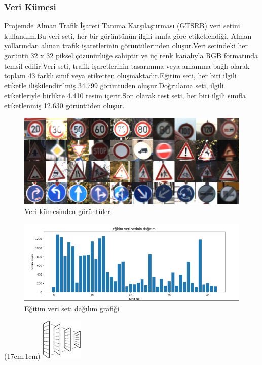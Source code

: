 \documentclass{article}
\begin{document}
\subsubsection{Veri Kümesi}
Projemde Alman Trafik İşareti Tanıma Karşılaştırması (GTSRB)\cite{ElectronicResearchDataArchive} veri setini kullandım.Bu veri seti, her bir görüntünün ilgili sınıfa göre etiketlendiği, Alman yollarından alınan trafik işaretlerinin görüntülerinden oluşur.Veri setindeki her görüntü 32 x 32 piksel çözünürlüğe sahiptir ve üç renk kanalıyla RGB formatında temsil edilir.Veri seti, trafik işaretlerinin tasarımına veya anlamına bağlı olarak toplam 43 farklı sınıf veya etiketten oluşmaktadır.Eğitim seti, her biri ilgili etiketle ilişkilendirilmiş 34.799 görüntüden oluşur.Doğrulama seti, ilgili etiketleriyle birlikte 4.410 resim içerir.Son olarak test seti, her biri ilgili sınıfla etiketlenmiş 12.630 görüntüden oluşur.\\[5pt]

\begin{figure}[h]
  \centering
  \includegraphics[width=1\textwidth]{image/Resim44.PNG} %
\caption{Veri kümesinden görüntüler.\cite{stallkamp2011german}}
  \label{fig:cnnmimari}  
\end{figure}


\begin{figure}[h]
  \centering
  \includegraphics[width=1.1\textwidth]{image/Resim48.PNG} %
\caption{Eğitim veri seti dağılım grafiği}
  \label{fig:cnnmimari}  
\end{figure}
\newpage
\begin{textblock*}{5cm}(17cm,1cm) %
    \includegraphics[width=2cm]{image/Resim45.png} %
\end{textblock*}
\end{document}
